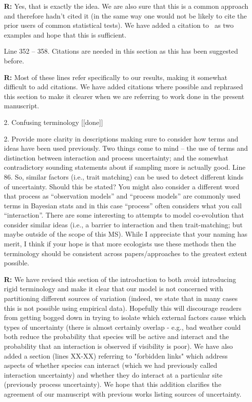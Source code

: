 \documentclass[12pt]{letter}
\newenvironment{refquote}{\bigskip \begin{it}}{\end{it}\smallskip}
\begin{document}
\begin{itemize}
		\textbf{R:} Yes, that is exactly the idea. We are also sure that this is a common approach and therefore hadn't cited it (in the same way one would not be likely to cite the prior users of common statistical tests). We have added a citation to~\citet{Vazquez2005,Guimera2009} as two examples and hope that this is sufficient.

		\begin{refquote}
		Line 352 – 358.  Citations are needed in this section as this has been suggested before.
		\end{refquote}

		\textbf{R:} Most of these lines refer specifically to our results, making it somewhat difficult to add citations. We have added citations where possible and rephrased this section to make it clearer when we are referring to work done in the present manuscript.


	2. Confusing terminology [[done]]

		\begin{refquote}
		2.      Provide more clarity in descriptions making sure to consider how terms and ideas have been used previously.  Two things come to mind – the use of terms and distinction between interaction and process uncertainty; and the somewhat contradictory sounding statements about if sampling more is actually good.
		\medskip
		Line 86.  So, similar factors (i.e., trait matching) can be used to detect different kinds of uncertainty.  Should this be stated?  You might also consider a different word that process as “observation models” and “process models” are commonly used terms in Bayesian stats and in this case “process” often considers what you call “interaction”.  There are some interesting to attempts to model co-evolution that consider similar ideas (i.e., a barrier to interaction and then trait-matching; but maybe outside of the scope of this MS). While I appreciate that your naming has merit, I think if your hope is that more ecologists use these methods then the terminology should be consistent across papers/approaches to the greatest extent possible.
		\end{refquote}


		\textbf{R:} We have revised this section of the introduction to both avoid introducing rigid terminology and make it clear that our model is not concerned with partitioning different sources of variation (indeed, we state that in many cases this is not possible using empirical data). Hopefully this will discourage readers from getting bogged down in trying to isolate which external factors cause which types of uncertainty (there is almost certainly overlap - e.g., bad weather could both reduce the probability that species will be active and interact and the probability that an interaction is observed if visibility is poor). We have also added a section (lines XX-XX) referring to "forbidden links" which address aspects of whether species can interact (which we had previously called interaction uncertainty) and whether they do interact at a particular site (previously process uncertainty). We hope that this addition clarifies the agreement of our manuscript with previous works listing sources of uncertainty.


\end{itemize}
\end{document}
